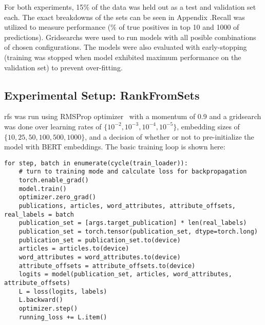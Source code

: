 For both experiments, 15$\%$ of the data was held out as a test and validation set each. The  exact breakdowns of the sets can be seen in Appendix .Recall was utilized to measure performance ($\%$ of true positives in top 10 and 1000 of predictions). Gridsearchs were used to run models with all posible combinations of chosen configurations. The models were also evaluated with early-stopping (training was stopped when model exhibited maximum performance on the validation set) to prevent over-fitting.

\subsection{Experimental Setup: RankFromSets}
\acrshort{rfs} was run using RMSProp optimizer~\parencite{tieleman2012lecture} with a momentum of 0.9 and a gridsearch was done over learning rates of $\{10^{-2}, 10^{-3}, 10^{-4}, 10^{-5}\}$, embedding sizes of $\{10, 25, 50, 100, 500, 1000\}$, and a decision of whether or not to pre-initialize the model with BERT embeddings. The basic training loop is shown here:
\begin{verbatim}
for step, batch in enumerate(cycle(train_loader)):
    # turn to training mode and calculate loss for backpropagation
    torch.enable_grad()
    model.train()
    optimizer.zero_grad()
    publications, articles, word_attributes, attribute_offsets, real_labels = batch
    publication_set = [args.target_publication] * len(real_labels)
    publication_set = torch.tensor(publication_set, dtype=torch.long)
    publication_set = publication_set.to(device)
    articles = articles.to(device)
    word_attributes = word_attributes.to(device)
    attribute_offsets = attribute_offsets.to(device)
    logits = model(publication_set, articles, word_attributes, attribute_offsets)
    L = loss(logits, labels)
    L.backward()
    optimizer.step()
    running_loss += L.item()
\end{verbatim}

